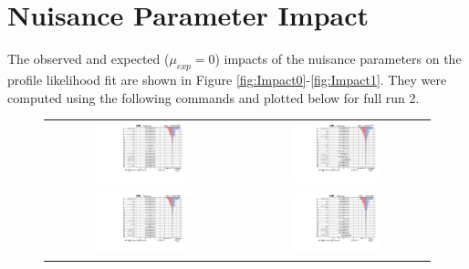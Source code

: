 \chapter{Nuisance Parameter Impact}

The observed and expected ($\mu_{exp}=$0) impacts of the nuisance parameters on the profile likelihood fit are shown in Figure \ref{fig:Impact0}-\ref{fig:Impact1}. They were computed using the following commands and plotted below for full run 2.

 \begin{figure}[tbh!]
 \begin{center}
 \begin{tabular}{cc}
 \includegraphics[width=0.48\textwidth]{figures/Appendix/Impact/Impact_TensorU_expected0}&
  \includegraphics[width=0.48\textwidth]{figures/Appendix/Impact/Impact_TensorU}\\
   \includegraphics[width=0.48\textwidth]{figures/Appendix/Impact/Impact_VecU_expected0}&
  \includegraphics[width=0.48\textwidth]{figures/Appendix/Impact/Impact_VecU}\\

\end{tabular}
\end{center}
\end{figure}
